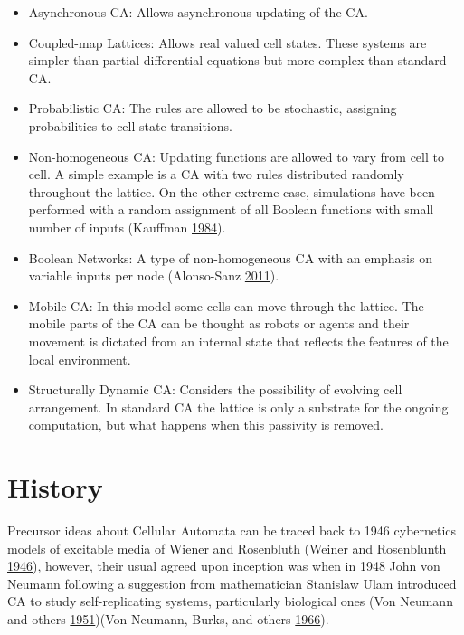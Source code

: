 \documentclass[
  12pt,
  openany]{book}
\begin{document}
\begin{itemize}
\item
  Asynchronous CA:
  Allows asynchronous updating of the CA.
\item
  Coupled-map Lattices:
  Allows real valued cell states. These systems are simpler than partial differential equations but more complex than standard CA.
\item
  Probabilistic CA:
  The rules are allowed to be stochastic, assigning probabilities to cell state transitions.
\item
  Non-homogeneous CA:
  Updating functions are allowed to vary from cell to cell. A simple example is a CA with two rules distributed randomly throughout the lattice. On the other extreme case, simulations have been performed with a random assignment of all Boolean functions with small number of inputs (Kauffman \protect\hyperlink{ref-kauffman1984emergent}{1984}).
\item
  Boolean Networks:
  A type of non-homogeneous CA with an emphasis on variable inputs per node (Alonso-Sanz \protect\hyperlink{ref-alonso2011discrete}{2011}).
\item
  Mobile CA:
  In this model some cells can move through the lattice. The mobile parts of the CA can be thought as robots or agents and their movement is dictated from an internal state that reflects the features of the local environment.
\item
  Structurally Dynamic CA:
  Considers the possibility of evolving cell arrangement. In standard CA the lattice is only a substrate for the ongoing computation, but what happens when this passivity is removed.
\end{itemize}

\hypertarget{history}{%
\section{History}\label{history}}

Precursor ideas about Cellular Automata can be traced back to 1946 cybernetics models of excitable media of Wiener and Rosenbluth (Weiner and Rosenblunth \protect\hyperlink{ref-weiner1946mathematical}{1946}), however, their usual agreed upon inception was when in 1948 John von Neumann following a suggestion from mathematician Stanislaw Ulam introduced CA to study self-replicating systems, particularly biological ones (Von Neumann and others \protect\hyperlink{ref-von1951general}{1951})(Von Neumann, Burks, and others \protect\hyperlink{ref-von1966theory}{1966}).
\end{document}
